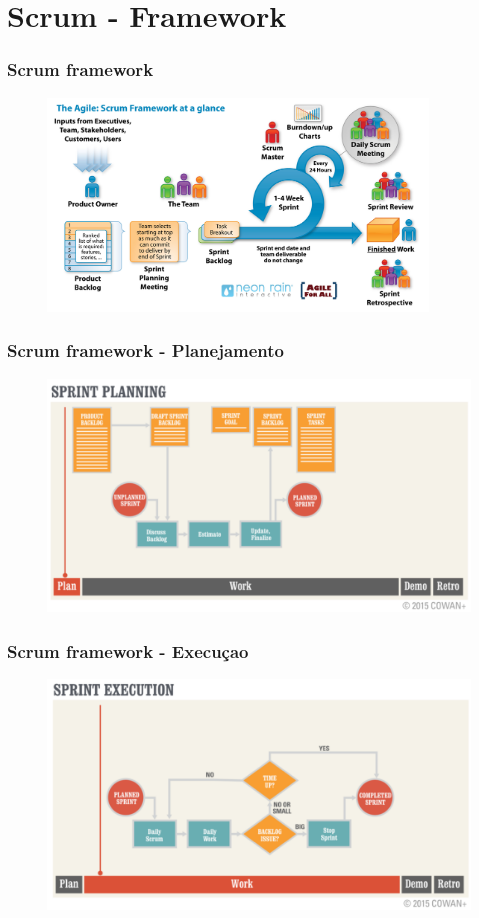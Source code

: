 \section{Scrum - Framework}
\begin{frame}
 \frametitle{Scrum framework}
  \begin{figure}
   \centering
   \includegraphics[width = 0.9\textwidth]{figs/Scrum.jpg}
  \end{figure}
\end{frame}

\begin{frame}
 \frametitle{Scrum framework -  Planejamento}
  \begin{figure}
   \centering
   \includegraphics[width =\textwidth]{figs/fases_sprint_planning.png}
  \end{figure}
\end{frame}

\begin{frame}
 \frametitle{Scrum framework -  Execuçao}
  \begin{figure}
   \centering
   \includegraphics[width = \textwidth]{figs/fases_sprint_execution.png}
  \end{figure}
\end{frame}

